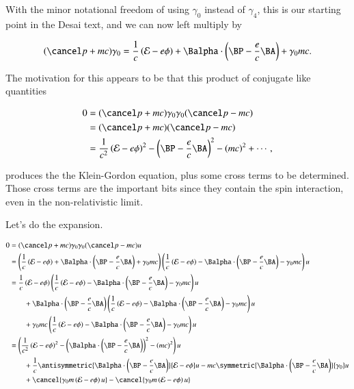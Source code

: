 With the minor notational freedom of using $\gamma_0$ instead of $\gamma_4$, this is our starting point in the Desai text, and we can now left multiply by

\begin{equation}\label{eqn:diracGauge:320}
(\pslash + m c) \gamma_0 =
\inv{c} \left( \mathcal{E} - e \phi \right)
+\Balpha \cdot \left(\BP - \frac{e}{c} \BA \right)
+ \gamma_0 m c.
\end{equation}

The motivation for this appears to be that this product of conjugate like quantities

\begin{equation}\label{eqn:diracGauge:340}
\begin{aligned}
0 &= (\pslash + m c) \gamma_0 \gamma_0 (\pslash - m c)  \\
&=
(\pslash + m c) (\pslash - m c) \\
&= \inv{c^2} \left( \mathcal{E} - e \phi \right)^2
 -\left( \BP - \frac{e}{c} \BA \right)^2 - (m c)^2 + \cdots,
\end{aligned}
\end{equation}

produces the the Klein-Gordon equation, plus some cross terms to be determined.  Those cross terms are the important bits since they contain the spin interaction, even in the non-relativistic limit.

Let's do the expansion.

\begin{align*}
0
&= (\pslash + m c) \gamma_0 \gamma_0 (\pslash - m c) u \\
&=
\left(
\inv{c} \left( \mathcal{E} - e \phi \right)
+\Balpha \cdot \left(\BP - \frac{e}{c} \BA \right)
+ \gamma_0 m c
\right)
\left(
\inv{c} \left( \mathcal{E}- e \phi \right)
-\Balpha \cdot \left(\BP - \frac{e}{c} \BA \right)
- \gamma_0 m c \right) u \\
&=
\inv{c} \left( \mathcal{E} - e \phi \right)
\left(
\inv{c} \left( \mathcal{E}- e \phi \right)
-\Balpha \cdot \left(\BP - \frac{e}{c} \BA \right)
- \gamma_0 m c \right) u \\
&\qquad +\Balpha \cdot \left(\BP - \frac{e}{c} \BA \right)
\left(
\inv{c} \left( \mathcal{E}- e \phi \right)
-\Balpha \cdot \left(\BP - \frac{e}{c} \BA \right)
- \gamma_0 m c \right) u \\
&\qquad + \gamma_0 m c
\left(
\inv{c} \left( \mathcal{E}- e \phi \right)
-\Balpha \cdot \left(\BP - \frac{e}{c} \BA \right)
- \gamma_0 m c \right) u \\
&=
\left(
\inv{c^2} \left( \mathcal{E} - e \phi \right)^2
- \left( \Balpha \cdot \left(\BP - \frac{e}{c} \BA \right) \right)^2
- (mc)^2
\right) u
\\
&\qquad + \inv{c} \antisymmetric{
\Balpha \cdot \left(\BP - \frac{e}{c} \BA \right)
}
{
\mathcal{E} - e \phi
} u
- m c
\symmetric{\Balpha \cdot \left(\BP - \frac{e}{c} \BA \right)}{ \gamma_0} u \\
&\qquad + \cancel{\gamma_0 m
\left(
\mathcal{E} - e \phi
\right) u
}
- \cancel{
\gamma_0 m
\left(
\mathcal{E} - e \phi
\right) u
}
\\
\end{align*}

